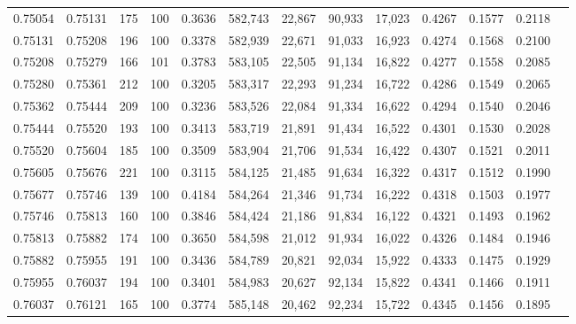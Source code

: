 \begin{tabular}{rrrrrrrrrrrrr}
0.75054 & 0.75131 &   175 & 100 &                                     0.3636 & 582,743 &  22,867 &  90,933 &  17,023 & 0.4267 & 0.1577 & 0.2118 \\
0.75131 & 0.75208 &   196 & 100 &                                     0.3378 & 582,939 &  22,671 &  91,033 &  16,923 & 0.4274 & 0.1568 & 0.2100 \\
0.75208 & 0.75279 &   166 & 101 &                                     0.3783 & 583,105 &  22,505 &  91,134 &  16,822 & 0.4277 & 0.1558 & 0.2085 \\
0.75280 & 0.75361 &   212 & 100 &                                     0.3205 & 583,317 &  22,293 &  91,234 &  16,722 & 0.4286 & 0.1549 & 0.2065 \\
0.75362 & 0.75444 &   209 & 100 &                                     0.3236 & 583,526 &  22,084 &  91,334 &  16,622 & 0.4294 & 0.1540 & 0.2046 \\
0.75444 & 0.75520 &   193 & 100 &                                     0.3413 & 583,719 &  21,891 &  91,434 &  16,522 & 0.4301 & 0.1530 & 0.2028 \\
0.75520 & 0.75604 &   185 & 100 &                                     0.3509 & 583,904 &  21,706 &  91,534 &  16,422 & 0.4307 & 0.1521 & 0.2011 \\
0.75605 & 0.75676 &   221 & 100 &                                     0.3115 & 584,125 &  21,485 &  91,634 &  16,322 & 0.4317 & 0.1512 & 0.1990 \\
0.75677 & 0.75746 &   139 & 100 &                                     0.4184 & 584,264 &  21,346 &  91,734 &  16,222 & 0.4318 & 0.1503 & 0.1977 \\
0.75746 & 0.75813 &   160 & 100 &                                     0.3846 & 584,424 &  21,186 &  91,834 &  16,122 & 0.4321 & 0.1493 & 0.1962 \\
0.75813 & 0.75882 &   174 & 100 &                                     0.3650 & 584,598 &  21,012 &  91,934 &  16,022 & 0.4326 & 0.1484 & 0.1946 \\
0.75882 & 0.75955 &   191 & 100 &                                     0.3436 & 584,789 &  20,821 &  92,034 &  15,922 & 0.4333 & 0.1475 & 0.1929 \\
0.75955 & 0.76037 &   194 & 100 &                                     0.3401 & 584,983 &  20,627 &  92,134 &  15,822 & 0.4341 & 0.1466 & 0.1911 \\
0.76037 & 0.76121 &   165 & 100 &                                     0.3774 & 585,148 &  20,462 &  92,234 &  15,722 & 0.4345 & 0.1456 & 0.1895 \\

\end{tabular}
